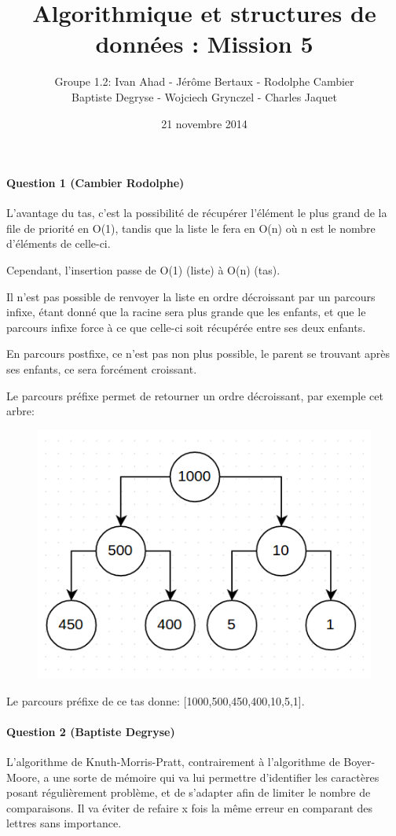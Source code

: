 \documentclass[a4paper]{article}
\title{Algorithmique et structures de données : Mission 5}
\date{21 novembre 2014}
\author{Groupe 1.2: Ivan Ahad - Jérôme Bertaux - Rodolphe Cambier \\ 
	Baptiste Degryse - Wojciech Grynczel - Charles Jaquet}
\begin{document}
\maketitle

\paragraph*{Question 1 (Cambier Rodolphe)}
L'avantage du tas, c'est la possibilité de récupérer l'élément le plus grand de la file de priorité en O(1), tandis que la liste le fera en O(n) où n est le nombre d'éléments de celle-ci.

Cependant, l'insertion passe de O(1) (liste) à O(n) (tas).

Il n'est pas possible de renvoyer la liste en ordre décroissant par un parcours infixe, étant donné que la racine sera plus grande que les enfants, et que le parcours infixe force à ce que celle-ci soit récupérée entre ses deux enfants.

En parcours postfixe, ce n'est pas non plus possible, le parent se trouvant après ses enfants, ce sera forcément croissant.

Le parcours préfixe permet de retourner un ordre décroissant, par exemple cet arbre:

\begin{figure}[H]
\centering
\includegraphics[scale=0.5]{tree.png}
\end{figure} 

Le parcours préfixe de ce tas donne: [1000,500,450,400,10,5,1].

 
\paragraph*{Question 2 (Baptiste Degryse)}
L'algorithme de Knuth-Morris-Pratt, contrairement à l'algorithme de Boyer-Moore, a une sorte de mémoire qui va lui permettre d'identifier les caractères posant régulièrement problème, et de s'adapter afin de limiter le nombre de comparaisons. Il va éviter de refaire x fois la même erreur en comparant des lettres sans importance.\\
\end{document}
